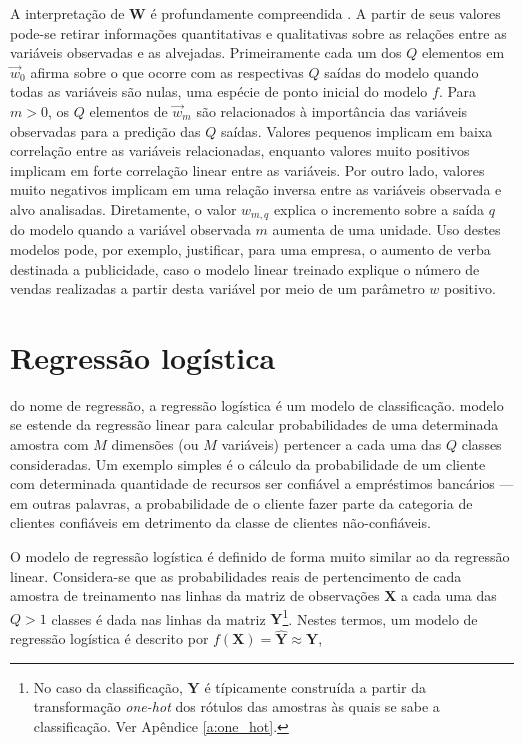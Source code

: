     A interpretação de $\boldsymbol{W}$ é profundamente compreendida . A partir de seus valores pode-se retirar informações quantitativas e qualitativas sobre as relações entre as variáveis observadas e as alvejadas. Primeiramente cada um dos $Q$ elementos em $\vec{w}_0$ afirma sobre o que ocorre com as respectivas $Q$ saídas do modelo quando todas as variáveis são nulas, uma espécie de ponto inicial do modelo $f$. Para $m>0$, os $Q$ elementos de $\vec{w}_m$ são relacionados à importância das variáveis observadas para a predição das $Q$ saídas. Valores pequenos implicam em baixa correlação entre as variáveis relacionadas, enquanto valores muito positivos implicam em forte correlação linear entre as variáveis. Por outro lado, valores muito negativos implicam em uma relação inversa entre as variáveis observada e alvo analisadas. Diretamente, o valor $w_{m,q}$ explica o incremento sobre a saída $q$ do modelo quando a variável observada $m$ aumenta de uma unidade. Uso destes modelos pode, por exemplo, justificar, para uma empresa, o aumento de verba destinada a publicidade, caso o modelo linear treinado explique o número de vendas realizadas a partir desta variável por meio de um parâmetro $w$ positivo.

  \section{Regressão logística}

    \DIFdelbegin {}\DIFdelend \DIFaddbegin {}\DIFaddend do nome de regressão, a regressão logística é um modelo de classificação. \DIFdelbegin {}\DIFdelend \DIFaddbegin {}\DIFaddend modelo se estende da regressão linear para calcular probabilidades de uma determinada amostra com $M$ dimensões (ou $M$ variáveis) pertencer a cada uma das $Q$ classes consideradas. Um exemplo simples é o cálculo da probabilidade de um cliente com determinada quantidade de recursos ser confiável a empréstimos bancários --- em outras palavras, a probabilidade de o cliente fazer parte da categoria de clientes confiáveis em detrimento da classe de clientes não-confiáveis.

    O modelo de regressão logística é definido de forma muito similar ao da regressão linear. Considera-se que as probabilidades reais de pertencimento de cada amostra de treinamento nas linhas da matriz de observações $\boldsymbol{X}$ a cada uma das $Q>1$ classes é dada nas linhas da matriz $\boldsymbol{Y}$\footnote{No caso da classificação, $\boldsymbol{Y}$ é típicamente construída a partir da transformação \textit{one-hot} dos rótulos das amostras às quais se sabe a classificação. Ver Apêndice \ref{a:one_hot}.}. Nestes termos, um modelo de regressão logística é descrito por $f(\boldsymbol{X}) = \boldsymbol{\hat{Y}} \approx \boldsymbol{Y}$, \DIFdelbegin {}\DIFdelend \DIFaddbegin {}\DIFaddend 

